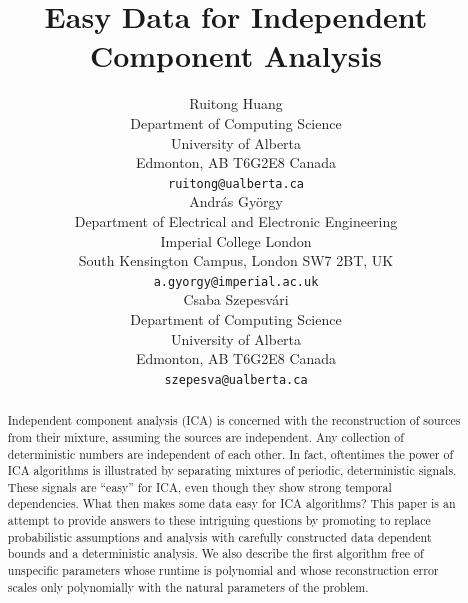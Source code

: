 \documentclass{article} %
\title{Easy Data for Independent Component Analysis}
\author{
Ruitong Huang \\
Department of Computing Science\\
University of Alberta \\
Edmonton, AB T6G2E8 Canada\\
\texttt{ruitong@ualberta.ca} \\
\And
Andr\'as Gy\"orgy \\
Department of Electrical and Electronic Engineering\\ 
Imperial College London\\ 
South Kensington Campus, London SW7 2BT, UK \\
\texttt{a.gyorgy@imperial.ac.uk} \\
\And
Csaba Szepesv\'ari \\
Department of Computing Science\\
University of Alberta \\
Edmonton, AB T6G2E8 Canada\\
\texttt{szepesva@ualberta.ca}
}
\theoremstyle{definition}
\begin{document}
\maketitle

\begin{abstract}
Independent component analysis (ICA) is concerned with the reconstruction of sources from their mixture, assuming the sources
are independent. 
Any collection of deterministic numbers are independent of each other.
In fact, oftentimes the power of ICA algorithms is illustrated by separating mixtures of periodic, deterministic signals.
These signals are ``easy'' for ICA, even though they show strong temporal dependencies.
What then makes some data easy for ICA algorithms? 
This paper is an attempt to provide answers to these intriguing questions by promoting to replace probabilistic assumptions
and analysis with carefully constructed data dependent bounds and a deterministic analysis.
We also describe the first algorithm free of unspecific parameters whose runtime is polynomial and whose
reconstruction error scales only polynomially with the natural parameters of the problem.  
\end{abstract}
\end{document}
